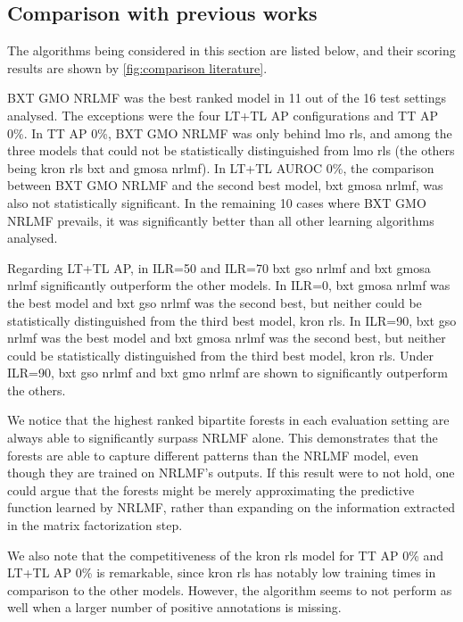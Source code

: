 %     


\subsection{Comparison with previous works}
\label{sec:comparison literature}

The algorithms being considered in this section are listed below, and their scoring results are shown by \autoref{fig:comparison literature}.

BXT GMO NRLMF was the best ranked model in 11 out of the 16 test settings analysed. The exceptions were the four LT+TL AP configurations and TT AP 0\%. In TT AP 0\%, BXT GMO NRLMF was only behind lmo rls, and among the three models that could not be statistically distinguished from lmo rls (the others being kron rls bxt and gmosa nrlmf). In LT+TL AUROC 0\%, the comparison between BXT GMO NRLMF and the second best model, bxt gmosa nrlmf, was also not statistically significant. In the remaining 10 cases where BXT GMO NRLMF prevails, it was significantly better than all other learning algorithms analysed.

Regarding LT+TL AP, in ILR=50 and ILR=70 bxt gso nrlmf and bxt gmosa nrlmf significantly outperform the other models. In ILR=0, bxt gmosa nrlmf was the best model and bxt gso nrlmf was the second best, but neither could be statistically distinguished from the third best model, kron rls. In ILR=90, bxt gso nrlmf was the best model and bxt gmosa nrlmf was the second best, but neither could be statistically distinguished from the third best model, kron rls. Under ILR=90, bxt gso nrlmf and bxt gmo nrlmf are shown to significantly outperform the others.

We notice that the highest ranked bipartite forests in each evaluation setting are always able to significantly surpass NRLMF alone. This demonstrates that the forests are able to capture different patterns than the NRLMF model, even though they are trained on NRLMF's outputs. If this result were to not hold, one could argue that the forests might be merely approximating the predictive function learned by NRLMF, rather than expanding on the information extracted in the matrix factorization step.

We also note that the competitiveness of the kron rls model for TT AP 0\% and LT+TL AP 0\% is remarkable, since kron rls has notably low training times in comparison to the other models.  %
However, the algorithm seems to not perform as well when a larger number of positive annotations is missing.

